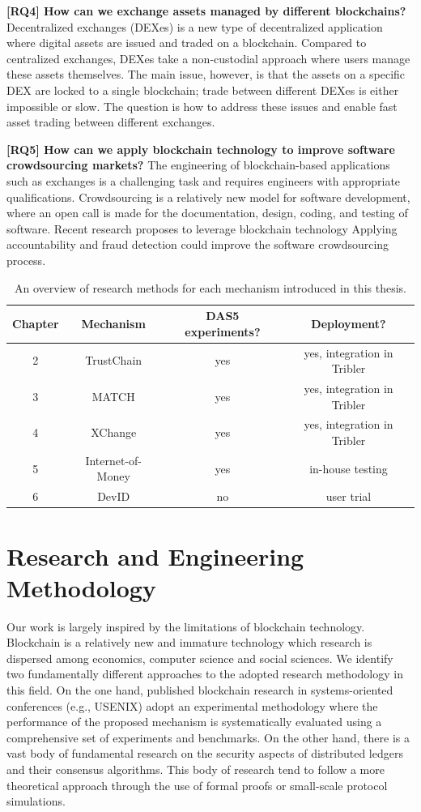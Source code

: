 \textbf{[RQ4] How can we exchange assets managed by different blockchains?}
Decentralized exchanges (DEXes) is a new type of decentralized application where digital assets are issued and traded on a blockchain.
Compared to centralized exchanges, DEXes take a non-custodial approach where users manage these assets themselves.
The main issue, however, is that the assets on a specific DEX are locked to a single blockchain; trade between different DEXes is either impossible or slow.
The question is how to address these issues and enable fast asset trading between different exchanges.

\textbf{[RQ5] How can we apply blockchain technology to improve software crowdsourcing markets?}
The engineering of blockchain-based applications such as exchanges is a challenging task and requires engineers with appropriate qualifications.
Crowdsourcing is a relatively new model for software development, where an open call is made for the documentation, design, coding, and testing of software.
Recent research proposes to leverage blockchain technology
Applying accountability and fraud detection could improve the software crowdsourcing process.

\begin{table}[t]
	\small
	\centering
	\begin{tabular}{ |c|c|c|c| }
		\hline
		\textbf{Chapter} & \textbf{Mechanism} & \textbf{DAS5 experiments?} & \textbf{Deployment?} \\ \hline
		2 & TrustChain & yes & yes, integration in Tribler \\ \hline
		3 & MATCH & yes & yes, integration in Tribler \\ \hline
		4 & XChange & yes & yes, integration in Tribler \\ \hline
		5 & Internet-of-Money & yes & in-house testing \\ \hline
		6 & DevID & no & user trial \\ \hline
	\end{tabular}
	\caption{An overview of research methods for each mechanism introduced in this thesis.}
	\label{table:research_methodology}
\end{table}

\section{Research and Engineering Methodology}
Our work is largely inspired by the limitations of blockchain technology.
Blockchain is a relatively new and immature technology which research is dispersed among economics, computer science and social sciences.
We identify two fundamentally different approaches to the adopted research methodology in this field.
On the one hand, published blockchain research in systems-oriented conferences (e.g., USENIX) adopt an experimental methodology where the performance of the proposed mechanism is systematically evaluated using a comprehensive set of experiments and benchmarks.
On the other hand, there is a vast body of fundamental research on the security aspects of distributed ledgers and their consensus algorithms.
This body of research tend to follow a more theoretical approach through the use of formal proofs or small-scale protocol simulations.

